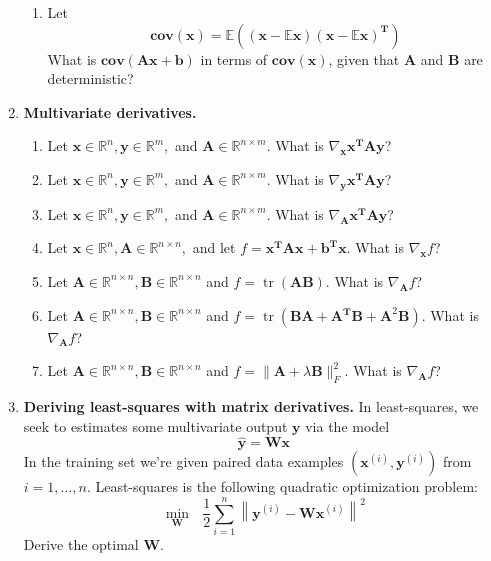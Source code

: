 \documentclass [11pt] {article}
\newcommand{\R}{\mathbb{R}}
\newcommand{\T}{\bf{T}}
\newcommand{\x}{\bf{x}}
\newcommand{\y}{\bf{y}}
\newcommand{\A}{\bf{A}}
\newcommand{\B}{\bf{B}}
\newcommand{\W}{\bf{W}}
\newcommand{\AT}{\bf{A$^{\T}$}}
\DeclareMathOperator{\tr}{tr}
\renewcommand{\bf}[1]{\textbf{{#1}}}
\begin{document}
\begin{enumerate}
\begin{enumerate}
            \item Let
                \[\bf{cov}(\x) = \mathbb{E}\left( \left( \x - \mathbb{E} \x \right) \left( \x - \mathbb{E} \x \right)^\T \right)\]
                What is $\bf{cov}(\A \x + \bf{b})$ in terms of $\bf{cov}(\x)$, given that $\A$ and 
                $\bf{B}$ are deterministic?
        \end{enumerate}

    \item \bf{Multivariate derivatives.}
        \begin{enumerate}[itemsep=10pt]
            \item Let $\x \in \R^n, \y \in \R^m,$ and $\A \in \R^{n \times m}$. 
                What is $\nabla_{\x} \x^{\T} \A \y$?
            \item Let $\x \in \R^n, \y \in \R^m,$ and $\A \in \R^{n \times m}$. 
                What is $\nabla_{\y} \x^{\T} \A \y$?
            \item Let $\x \in \R^n, \y \in \R^m,$ and $\A \in \R^{n \times m}$. 
                What is $\nabla_{\A} \x^{\T} \A \y$?
            \item Let $\x \in \R^n, \A \in \R^{n \times n},$ and let 
                $f = \x^{\T} \A \x + \bf{b}^{\T} \x$. What is $\nabla_{\x} f$?
            \item Let $\A \in \R^{n \times n}, \B \in \R^{n \times n}$ and 
                $f = \tr\left( \A \B \right)$. What is $\nabla_{\A} f$?
            \item Let $\A \in \R^{n \times n}, \B \in \R^{n \times n}$ and 
                $f = \tr\left( \B \A + \AT \B + \A^2 \B \right)$. What is $\nabla_{\A} f$?
            \item Let $\A \in \R^{n \times n}, \B \in \R^{n \times n}$ and 
                $f = \| \A + \lambda \B \|^{2}_{F}$. What is $\nabla_{\A} f$?
        \end{enumerate}

    \item \bf{Deriving least-squares with matrix derivatives.} 
        \newline
        In least-squares, we seek to estimates some multivariate output $\y$ via the model
        \[\hat{\bf{y}} = \W \x\]
        In the training set we're given paired data examples $\left( \x^{(i)}, \y^{(i)} \right)$
        from $i = 1, \ldots, n$. Least-squares is the following quadratic optimization problem:
        \[\underset{\W}{\min} \text{ } \frac{1}{2} \sum^{n}_{i = 1} \left\| \y^{(i)} - \W \x^{(i)} \right\|^2\]
        Derive the optimal $\W$. \vspace{10pt}


\end{enumerate}
\end{document}
